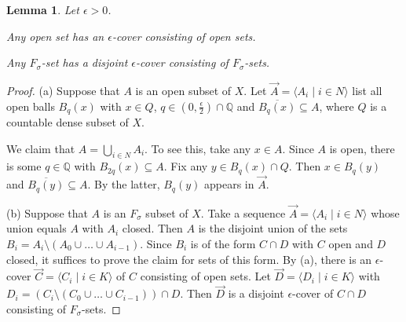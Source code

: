 \documentclass[10pt]{amsart}
\newcommand{\QQ}{\mathbb{Q}}
\newtheorem{lemma}[theorem]{Lemma}
\theoremstyle{definition}
\theoremstyle{remark}
\newenvironment{enumerate-(a)}{\begin{enumerate}[label={\upshape (\alph*)}, leftmargin=2pc]}{\end{enumerate}}
\begin{document}
\begin{lemma} \label{partition epsilon-covers} 
Let $\epsilon>0$. 
\begin{enumerate-(a)} 
\item \label{partition epsilon-covers - open sets} 
Any open set has an $\epsilon$-cover consisting of open sets. 
\item 
Any $F_\sigma$-set has a disjoint $\epsilon$-cover consisting of $F_\sigma$-sets. 
\end{enumerate-(a)} 
\end{lemma} 
\begin{proof} 
(a) 
Suppose that $A$ is an open subset of $X$. 
Let $\vec{A}=\langle A_i\mid i\in N\rangle$ list all open balls $B_q(x)$ with $x\in Q$, $q\in (0,\frac{\epsilon}{2})\cap \QQ$ and $\overline{B_q(x)}\subseteq A$, where $Q$ is a countable dense subset of $X$. 

We claim that $A=\bigcup_{i\in N} A_i$. To see this, take any $x\in A$. 
Since $A$ is open, there is some $q\in \QQ$ with $B_{2q}(x)\subseteq A$. 
Fix any $y\in B_q(x)\cap Q$. 
Then $x\in B_q(y)$ and $\overline{B_q(y)}\subseteq A$. 
By the latter, $B_q(y)$ appears in $\vec{A}$. 

(b) 
Suppose that $A$ is an $F_\sigma$ subset of $X$. 
Take a sequence $\vec{A}=\langle A_i\mid i\in N\rangle$ whose union equals $A$ with $A_i$ closed. 
Then $A$ is the disjoint union of the sets $B_i=A_i\setminus (A_0\cup\dots\cup A_{i-1})$. 
Since $B_i$ is of the form $C\cap D$ with $C$ open and $D$ closed, it suffices to prove the claim for sets of this form. 
By (a), there is an $\epsilon$-cover $\vec{C}=\langle C_i\mid i\in K\rangle$ of $C$ consisting of open sets. 
Let $\vec{D}=\langle D_i\mid i\in K\rangle$ with $D_i=(C_i\setminus (C_0\cup\dots\cup C_{i-1}))\cap D$. 
Then $\vec{D}$ is a disjoint $\epsilon$-cover of $C\cap D$ consisting of $F_\sigma$-sets. 
\end{proof} 
\end{document}
